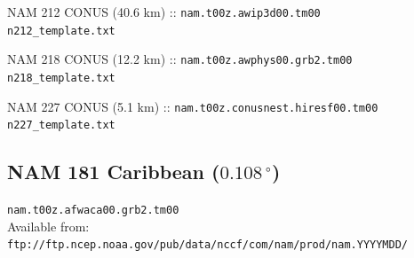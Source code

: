 \documentclass[11pt]{article}   %
\begin{document}
NAM 212 CONUS (40.6 km) :: \verb|nam.t00z.awip3d00.tm00|\\
\verb|n212_template.txt| \\
\tiny  \normalsize

NAM 218 CONUS (12.2 km) :: \verb|nam.t00z.awphys00.grb2.tm00|\\
\verb|n218_template.txt| \\
\tiny  \normalsize

NAM 227 CONUS (5.1 km)  :: \verb|nam.t00z.conusnest.hiresf00.tm00|\\
\verb|n227_template.txt| \\
\tiny  \normalsize

\clearpage
\subsection{NAM 181 Caribbean ($0.108  \, ^{\circ}$)}

\verb|nam.t00z.afwaca00.grb2.tm00|\\
Available from:\\
\verb|ftp://ftp.ncep.noaa.gov/pub/data/nccf/com/nam/prod/nam.YYYYMDD/|
\end{document}
